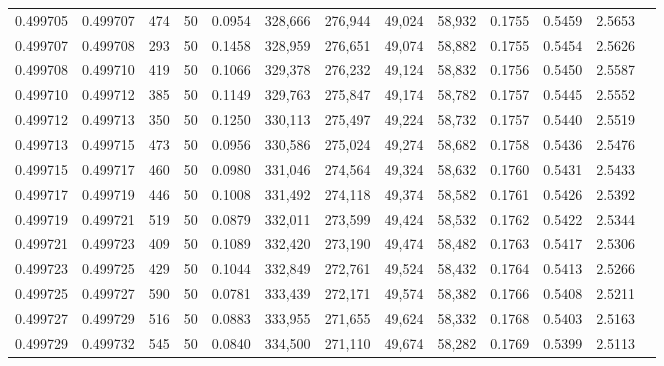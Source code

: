 \begin{tabular}{rrrrrrrrrrrrr}
0.499705 & 0.499707 & 474 &  50 &                                     0.0954 & 328,666 & 276,944 &  49,024 &  58,932 & 0.1755 & 0.5459 & 2.5653 \\
0.499707 & 0.499708 & 293 &  50 &                                     0.1458 & 328,959 & 276,651 &  49,074 &  58,882 & 0.1755 & 0.5454 & 2.5626 \\
0.499708 & 0.499710 & 419 &  50 &                                     0.1066 & 329,378 & 276,232 &  49,124 &  58,832 & 0.1756 & 0.5450 & 2.5587 \\
0.499710 & 0.499712 & 385 &  50 &                                     0.1149 & 329,763 & 275,847 &  49,174 &  58,782 & 0.1757 & 0.5445 & 2.5552 \\
0.499712 & 0.499713 & 350 &  50 &                                     0.1250 & 330,113 & 275,497 &  49,224 &  58,732 & 0.1757 & 0.5440 & 2.5519 \\
0.499713 & 0.499715 & 473 &  50 &                                     0.0956 & 330,586 & 275,024 &  49,274 &  58,682 & 0.1758 & 0.5436 & 2.5476 \\
0.499715 & 0.499717 & 460 &  50 &                                     0.0980 & 331,046 & 274,564 &  49,324 &  58,632 & 0.1760 & 0.5431 & 2.5433 \\
0.499717 & 0.499719 & 446 &  50 &                                     0.1008 & 331,492 & 274,118 &  49,374 &  58,582 & 0.1761 & 0.5426 & 2.5392 \\
0.499719 & 0.499721 & 519 &  50 &                                     0.0879 & 332,011 & 273,599 &  49,424 &  58,532 & 0.1762 & 0.5422 & 2.5344 \\
0.499721 & 0.499723 & 409 &  50 &                                     0.1089 & 332,420 & 273,190 &  49,474 &  58,482 & 0.1763 & 0.5417 & 2.5306 \\
0.499723 & 0.499725 & 429 &  50 &                                     0.1044 & 332,849 & 272,761 &  49,524 &  58,432 & 0.1764 & 0.5413 & 2.5266 \\
0.499725 & 0.499727 & 590 &  50 &                                     0.0781 & 333,439 & 272,171 &  49,574 &  58,382 & 0.1766 & 0.5408 & 2.5211 \\
0.499727 & 0.499729 & 516 &  50 &                                     0.0883 & 333,955 & 271,655 &  49,624 &  58,332 & 0.1768 & 0.5403 & 2.5163 \\
0.499729 & 0.499732 & 545 &  50 &                                     0.0840 & 334,500 & 271,110 &  49,674 &  58,282 & 0.1769 & 0.5399 & 2.5113 \\

\end{tabular}
